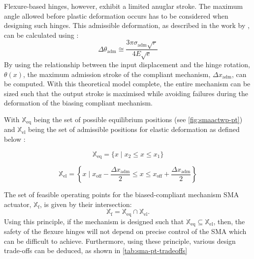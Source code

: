 Flexure-based hinges, however, exhibit a limited anuglar stroke. The maximum angle allowed before plastic deformation occurs has to be considered when designing such hinges. This admissible deformation, as described in the work by \cite{heneinConceptionStructuresArticulees2005}, can be calculated using :
\begin{equation}\label{eq:theta_adm}
    \Delta\theta_\mathrm{adm}\cong \frac{3\pi \sigma_\text{adm}\sqrt{r}}{4E\sqrt{e}}
\end{equation}
By using the relationship between the input displacement and the hinge rotation, $\theta(x)$, the maximum admission stroke of the compliant mechanism, $\Delta x_\mathrm{adm}$, can be computed. With this theoretical model complete, the entire mechanism can be sized such that the output stroke is maximised while avoiding failures during the deformation of the biasing compliant mechanism.

With $\mathbb{X}_\text{eq}$ being the set of possible equilibrium positions (see \cref{fig:smaactwp-pt}) and $\mathbb{X}_\text{el}$ being the set of admissible positions for elastic deformation as defined below :

\begin{equation}\label{eq:X_eq}
    \mathbb{X}_\text{eq} = \{ x \;|\;  x_{2}\leqslant x \leqslant x_{1}\}
\end{equation}

\begin{equation}\label{eq:X_adm}
    \mathbb{X}_\text{el} =  \left\{ x \; | \; x_\text{off} - \frac{\Delta x_{\text{adm}}}{2} \leqslant x \leqslant x_\text{off} + \frac{\Delta x_{\text{adm}}}{2} \right\}
\end{equation}

The set of feasible operating points for the biased-compliant mechanism SMA actuator, $\mathbb{X}_\text{f}$, is given by their intersection:
\begin{equation}
   \mathbb{X}_\text{f} = \mathbb{X}_\text{eq} \cap \mathbb{X}_\text{el}.
\end{equation}
Using this principle, if the mechanism is designed such that  $\mathbb{X}_\text{eq} \subseteq \mathbb{X}_\text{el}$, then, the safety of the flexure hinges will not depend on precise control of the SMA which can be difficult to achieve. Furthermore, using these principle, various design trade-offs can be deduced, as shown in \cref{tab:sma-pt-tradeoffs}

\renewcommand{\arraystretch}{1.5} %


